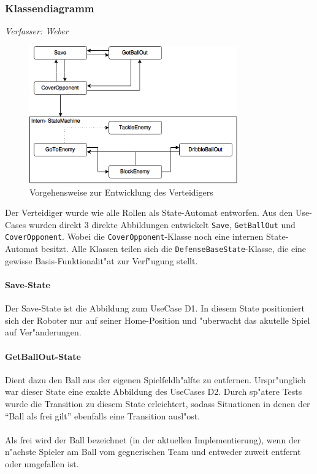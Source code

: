 \subsubsection{Klassendiagramm}
\textit{Verfasser: Weber}\\
\begin{figure}[H]
	\centering
	\includegraphics[width=0.8\textwidth]{Grafiken/KI/defender/defender.png}
	\caption{Vorgehensweise zur Entwicklung des Verteidigers}
	\label{Vorgehensweise-Verteidigers}
\end{figure}

Der Verteidiger wurde wie alle Rollen als State-Automat entworfen. Aus den Use-Cases wurden direkt 3 direkte Abbildungen entwickelt \lstinline{Save}, \lstinline{GetBallOut} und \lstinline{CoverOpponent}. Wobei die \lstinline{CoverOpponent}-Klasse noch eine internen State-Automat besitzt. Alle Klassen teilen sich die \lstinline{DefenseBaseState}-Klasse, die eine gewisse Basis-Funktionalit"at zur Verf"ugung stellt.

\paragraph{Save-State}
Der Save-State ist die Abbildung zum UseCase D1. In diesem State positioniert sich der Roboter nur auf seiner Home-Position und "uberwacht das akutelle Spiel auf Ver"anderungen.

\paragraph{GetBallOut-State}
Dient dazu den Ball aus der eigenen Spielfeldh"alfte zu entfernen. Urspr"unglich war dieser State eine exakte Abbildung des UseCases D2. Durch sp"atere Tests wurde die Transition zu diesem State erleichtert, sodass Situationen in denen der ``Ball als frei gilt'' ebenfalls eine Transition ausl"ost.\\
\\
Als frei wird der Ball bezeichnet (in der aktuellen Implementierung), wenn der n"achste Spieler am Ball vom gegnerischen Team und entweder zuweit entfernt oder umgefallen ist.

